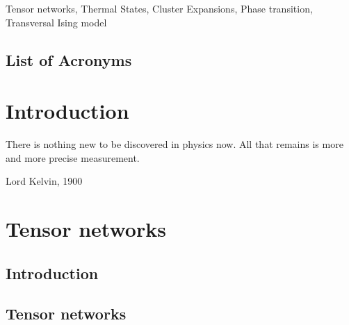 \documentclass{book}
\newcounter{a}
\newcounter{b}
\begin{document}
Tensor networks, Thermal States, Cluster Expansions, Phase transition, Transversal Ising model

\newpage




\setcounter{tocdepth}{3}
\tableofcontents

\newpage

\section*{List of Acronyms}
\begin{acronym}
\end{acronym}


\mainmatter


\chapter{Introduction}\label{chap1}

\epigraph{There is nothing new to be discovered in physics now. All that remains is more and more precise measurement.}{Lord Kelvin, 1900}



\chapter{Tensor networks}\label{chap2}

\section{Introduction}


\section{Tensor networks}

\end{document}
